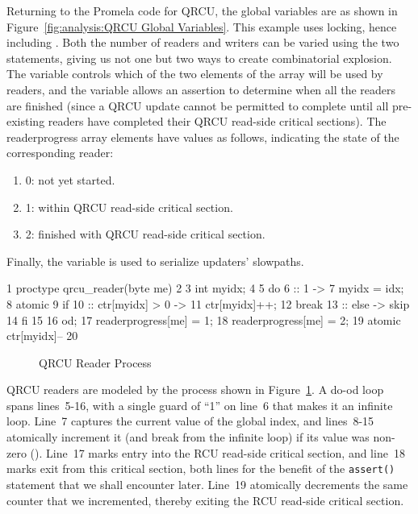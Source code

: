Returning to the Promela code for QRCU, the global variables are as shown in
Figure~\ref{fig:analysis:QRCU Global Variables}.
This example uses locking, hence including .
Both the number of readers and writers can be varied using the
two  statements, giving us not one but two ways to create
combinatorial explosion.
The  variable controls which of the two elements of the 
array will be used by readers, and the  variable
allows an assertion to determine when all the readers are finished
(since a QRCU update cannot be permitted to complete until all
pre-existing readers have completed their QRCU read-side critical
sections).
The readerprogress array elements have values as follows,
indicating the state of the corresponding reader:

\begin{enumerate}
\item	0: not yet started.
\item	1: within QRCU read-side critical section.
\item	2: finished with QRCU read-side critical section.
\end{enumerate}

Finally, the  variable is used to serialize updaters' slowpaths.

{ \scriptsize
\begin{verbbox}
  1 proctype qrcu_reader(byte me)
  2 {
  3   int myidx;
  4
  5   do
  6   :: 1 ->
  7     myidx = idx;
  8     atomic {
  9       if
 10       :: ctr[myidx] > 0 ->
 11         ctr[myidx]++;
 12         break
 13       :: else -> skip
 14       fi
 15     }
 16   od;
 17   readerprogress[me] = 1;
 18   readerprogress[me] = 2;
 19   atomic { ctr[myidx]-- }
 20 }
\end{verbbox}
}
\begin{figure}[htbp]
\centering
\theverbbox
\caption{QRCU Reader Process}
\label{fig:analysis:QRCU Reader Process}
\end{figure}

QRCU readers are modeled by the  process shown in
Figure~\ref{fig:analysis:QRCU Reader Process}.
A do-od loop spans lines~5-16, with a single guard of ``1''
on line~6 that makes it an infinite loop.
Line~7 captures the current value of the global index, and lines~8-15
atomically increment it (and break from the infinite loop)
if its value was non-zero ().
Line~17 marks entry into the RCU read-side critical section, and
line~18 marks exit from this critical section, both lines for the benefit of
the {\tt assert()} statement that we shall encounter later.
Line~19 atomically decrements the same counter that we incremented,
thereby exiting the RCU read-side critical section.

